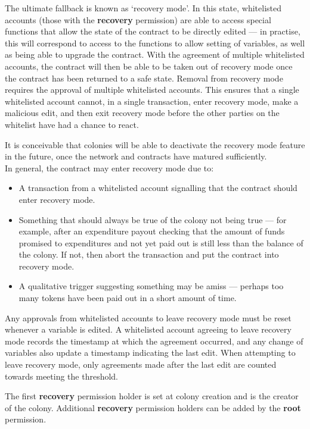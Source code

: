 The ultimate fallback is known as `recovery mode'. In this state, whitelisted accounts (those with the \textbf{recovery} permission) are able to access special functions that allow the state of the contract to be directly edited --- in practise, this will correspond to access to the functions to allow setting of variables, as well as being able to upgrade the contract. With the agreement of multiple whitelisted accounts, the contract will then be able to be taken out of recovery mode once the contract has been returned to a safe state. Removal from recovery mode requires the approval of multiple whitelisted accounts. This ensures that a single whitelisted account cannot, in a single transaction, enter recovery mode, make a malicious edit, and then exit recovery mode before the other parties on the whitelist have had a chance to react.

It is conceivable that colonies will be able to deactivate the recovery mode feature in the future, once the network and contracts have matured sufficiently. \\

In general, the contract may enter recovery mode due to:

\begin{itemize}
 \item A transaction from a whitelisted account signalling that the contract should enter recovery mode.
 \item Something that should always be true of the colony not being true --- for example, after an expenditure payout checking that the amount of funds promised to expenditures and not yet paid out is still less than the balance of the colony. If not, then abort the transaction and put the contract into recovery mode.
 \item A qualitative trigger suggesting something may be amiss --- perhaps too many tokens have been paid out in a short amount of time.
\end{itemize}

Any approvals from whitelisted accounts to leave recovery mode must be reset whenever a variable is edited. A whitelisted account agreeing to leave recovery mode records the timestamp at which the agreement occurred, and any change of variables also update a timestamp indicating the last edit. When attempting to leave recovery mode, only agreements made after the last edit are counted towards meeting the threshold.

The first \textbf{recovery} permission holder is set at colony creation and is the creator of the colony. Additional \textbf{recovery} permission holders can be added by the \textbf{root} permission.

